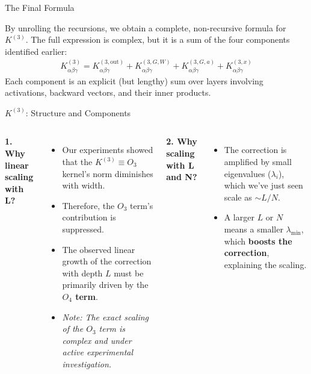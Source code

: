 \documentclass{beamer}
\begin{document}
\begin{frame}{The Final Formula}
\begin{theorem}
By unrolling the recursions, we obtain a complete, non-recursive formula for $K^{(3)}$. The full expression is complex, but it is a sum of the four components identified earlier:
\begin{align*}
K^{(3)}_{\alpha\beta\gamma} = K^{(3,\text{out})}_{\alpha\beta\gamma} + K^{(3,G,W)}_{\alpha\beta\gamma} + K^{(3,G,a)}_{\alpha\beta\gamma} + K^{(3,x)}_{\alpha\beta\gamma}
\end{align*}
Each component is an explicit (but lengthy) sum over layers involving activations, backward vectors, and their inner products.
\end{theorem}
\end{frame}

\begin{frame}{$K^{(3)}$: Structure and Components}
\begin{columns}
\textbf{1. Why linear scaling with L?}
\begin{itemize}
    \item Our experiments showed that the $K^{(3)} \equiv O_3$ kernel's norm diminishes with width.
    \item Therefore, the $O_3$ term's contribution is suppressed.
    \item The observed linear growth of the correction with depth $L$ must be primarily driven by the \textbf{$O_4$ term}.
    \item \textit{Note: The exact scaling of the $O_3$ term is complex and under active experimental investigation.}
\end{itemize}

\textbf{2. Why scaling with L and N?}
\begin{itemize}
    \item The correction is amplified by small eigenvalues ($\lambda_i$), which we've just seen scale as $\sim L/N$.
    \item A larger $L$ or $N$ means a smaller $\lambda_{\min}$, which \textbf{boosts the correction}, explaining the scaling.
\end{itemize}
\end{columns}
\end{frame}
\end{document}
